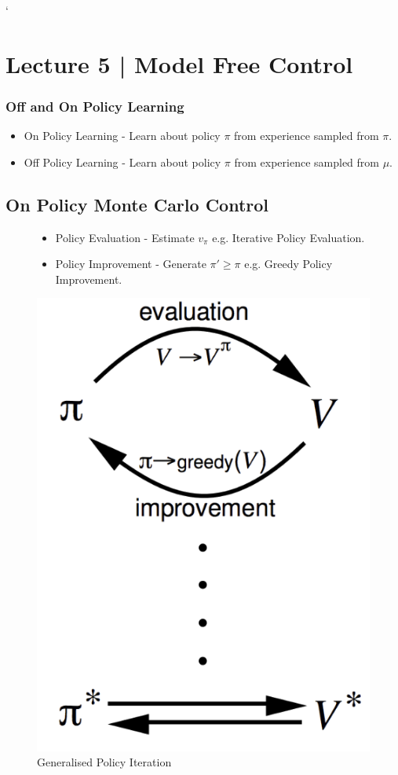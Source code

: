 `\section{Lecture 5 | Model Free Control}

\subsubsection*{Off and On Policy Learning}
\begin{itemize}
  \item On Policy Learning - Learn about policy \(\pi \) from experience sampled from \(\pi \).
  \item Off Policy Learning - Learn about policy \(\pi \) from experience sampled from \(\mu \).
\end{itemize}

\subsection{On Policy Monte Carlo Control}

\begin{figure}[H]
    \begin{minipage}{0.5\textwidth}
        \begin{itemize}
            \item Policy Evaluation - Estimate \(v_\pi \) e.g. Iterative Policy Evaluation. 
            \item Policy Improvement - Generate \(\pi' \geq \pi \) e.g. Greedy Policy Improvement.
          \end{itemize}
    \end{minipage}%
    \begin{minipage}{0.5\textwidth}
      \centering
      \includegraphics[height=0.75\textwidth]{figures/gpi.png}
      \caption{Generalised Policy Iteration}
        \label{fig:gpi}
    \end{minipage}
  \end{figure}

